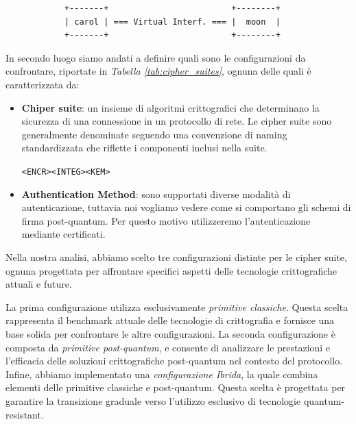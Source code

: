 \begin{center}
    \begin{verbatim}
            +-------+                         +--------+ 
            | carol | === Virtual Interf. === |  moon  |
            +-------+                         +--------+ 
    \end{verbatim}
\end{center}

\noindent
In secondo luogo siamo andati a definire quali sono le configurazioni da confrontare, riportate in 
\textit{Tabella \ref{tab:cipher_suites}}, ognuna delle quali è caratterizzata da:

\begin{itemize}
    \item \textbf{Chiper suite}: un insieme di algoritmi crittografici che determinano la sicurezza di una connessione in un protocollo di rete.
    Le cipher suite sono generalmente denominate seguendo una convenzione di naming standardizzata che riflette i componenti inclusi nella suite.
    \begin{center}
        \texttt{<ENCR>\text{-}<INTEG>\text{-}<KEM>}
    \end{center}

    \item \textbf{Authentication Method}: sono supportati diverse modalità di autentica\-zione, tuttavia noi vogliamo vedere
    come si comportano gli schemi di firma post-quantum. Per questo motivo utilizzeremo l'autenticazione mediante 
    certificati. 
\end{itemize}

\noindent
Nella nostra analisi, abbiamo scelto tre configurazioni distinte per le cipher
suite, ognuna progettata per affrontare specifici aspetti delle tecnologie
critto\-grafiche attuali e future.

\noindent
La prima configurazione utilizza esclusivamente \textit{primitive classiche}. 
Questa scelta rappresenta il benchmark attuale delle tecnologie di crittografia e fornisce una base
solida per confrontare le altre configurazioni. La seconda
configurazione è composta da \textit{primitive post-quantum}, e consente di
analizzare le prestazioni e l'efficacia delle soluzioni crittografiche
post-quantum nel contesto del protocollo. Infine, abbiamo implementato
una \textit{configurazione Ibrida}, la quale combina elementi delle primitive
classiche e post-quantum. Questa scelta è progettata per garantire la transizione 
graduale verso l'utilizzo esclusivo di tecnologie quantum-resistant.

